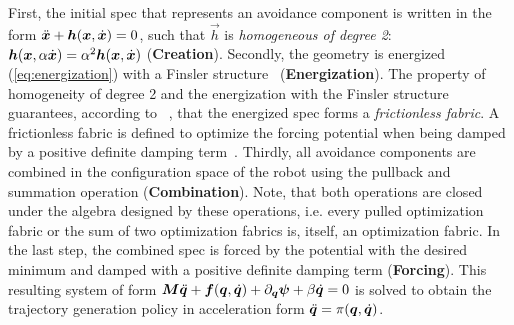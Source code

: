 First, the initial spec that represents an avoidance component
is written in the form $\ddot{\bm{x}} + \bm{h}(\bm{x},\dot{\bm{x}}) = 0$,
such that $\vec{h}$ is \textit{homogeneous of degree 2}:
$\bm{h}(\bm{x},\alpha\dot{\bm{x}}) = \alpha^2\bm{h}(\bm{x},\dot{\bm{x}})$ 
(\textbf{Creation}). 
Secondly, the geometry is
energized (\cref{eq:energization})
with a Finsler structure~\cite[Definition 5.4]{Ratliff2020} (\textbf{Energization}).
The property of homogeneity of degree 2 and the energization with the Finsler structure
guarantees, according to ~\cite[Theorem 4.29]{Ratliff2020}, that the energized spec
forms a \textit{frictionless fabric}.
A frictionless fabric is defined to optimize the forcing potential \forc{} when being
damped by a positive definite damping term~\cite[Definition 4.4]{Ratliff2020}.
Thirdly, all avoidance components are combined in the configuration space
of the robot using the pullback and summation operation (\textbf{Combination}).
Note, that both operations are closed 
under the algebra designed by these operations, i.e. every pulled optimization fabric or the sum
of two optimization fabrics is, itself, an optimization fabric.
In the last step, the combined spec is forced by the potential \forc{} with the desired minimum and
damped with a positive definite damping term (\textbf{Forcing}).
This resulting system of form $\bm{M}\ddot{\bm{q}} + \bm{f}(\bm{q}, \dot{\bm{q}}) + \partial_{\bm{q}}\bm{\psi} + \beta\dot{\bm{q}} = 0$ is solved to 
obtain the trajectory generation policy in acceleration form $\ddot{\bm{q}} = \pi(\bm{q},\dot{\bm{q}})$.

